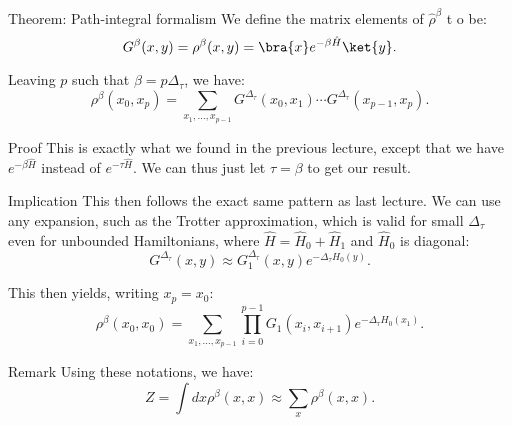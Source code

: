 \documentclass[a4paper]{article}
\begin{document}
\begin{parag}{Theorem: Path-integral formalism}
    We define the matrix elements of $\hat{\rho}^{\beta}$ t o be: 
    \[G^{\beta}\left(x, y\right) = \rho^{\beta}\left(x, y\right) = \bra{x} e^{-\beta \hat{H}} \ket{y}.\]
    
    Leaving $p$ such that $\beta = p \Delta_{\tau}$, we have: 
    \[\rho^{\beta}\left(x_0, x_p\right) = \sum_{x_1, \ldots, x_{p-1}} G^{\Delta_{\tau}}\left(x_0, x_1\right) \cdots G^{\Delta_{\tau}}\left(x_{p-1}, x_p\right).\]

    \begin{subparag}{Proof}
        This is exactly what we found in the previous lecture, except that we have $e^{-\beta \hat{H}}$ instead of $e^{- \tau \hat{H}}$. We can thus just let $\tau = \beta$ to get our result.
    \end{subparag}

    \begin{subparag}{Implication}
        This then follows the exact same pattern as last lecture. We can use any expansion, such as the Trotter approximation, which is valid for small $\Delta_{\tau}$ even for unbounded Hamiltonians, where $\hat{H} = \hat{H}_0 + \hat{H}_1$ and $\hat{H}_0$ is diagonal: 
        \[G^{\Delta_{\tau}}\left(x, y\right) \approx G_1^{\Delta_{\tau}}\left(x, y\right) e^{-\Delta_{\tau} H_0\left(y\right)}.\]

        This then yields, writing $x_p = x_0$:
        \[\rho^{\beta}\left(x_0, x_0\right) = \sum_{x_1, \ldots, x_{p-1}} \prod_{i=0}^{p-1} G_1\left(x_i, x_{i+1}\right) e^{-\Delta_{\tau} H_0\left(x_1\right)}.\]
    \end{subparag}

    \begin{subparag}{Remark}
        Using these notations, we have:
        \[Z = \int dx \rho^{\beta}\left(x, x\right) \approx \sum_{x} \rho^{\beta}\left(x, x\right).\]
    \end{subparag}
\end{parag}
\end{document}
